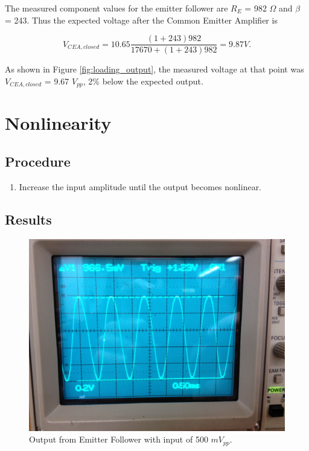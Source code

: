 \documentclass[12pt,letterpaper]{report}
\newlength \figwidth
\begin{document}
The measured component values for the emitter follower are $R_{E}$ = 982 $\Omega$ and $\beta$ = 243. Thus the expected voltage after the Common Emitter Amplifier is

$$
V_{CEA,closed} = 10.65 \frac{(1+243)982}{17670+(1+243)982} = 9.87 V.
$$

As shown in Figure \ref{fig:loading_output}, the measured voltage at that point was $V_{CEA,closed}$ = 9.67 $V_{pp}$, 2\% below the expected output.


\section*{Nonlinearity}
\subsection*{Procedure}
\begin{enumerate}
\item Increase the input amplitude until the output becomes nonlinear.
\end{enumerate}

\subsection*{Results}
\begin{figure}[H]
\centering
\includegraphics[width=\figwidth, keepaspectratio=true]{lab6_images/loading_output.jpg}
\caption{Output from Emitter Follower with input of 500 $mV_{pp}$.}
\label{fig:nonlinear_output}
\end{figure}
\end{document}
